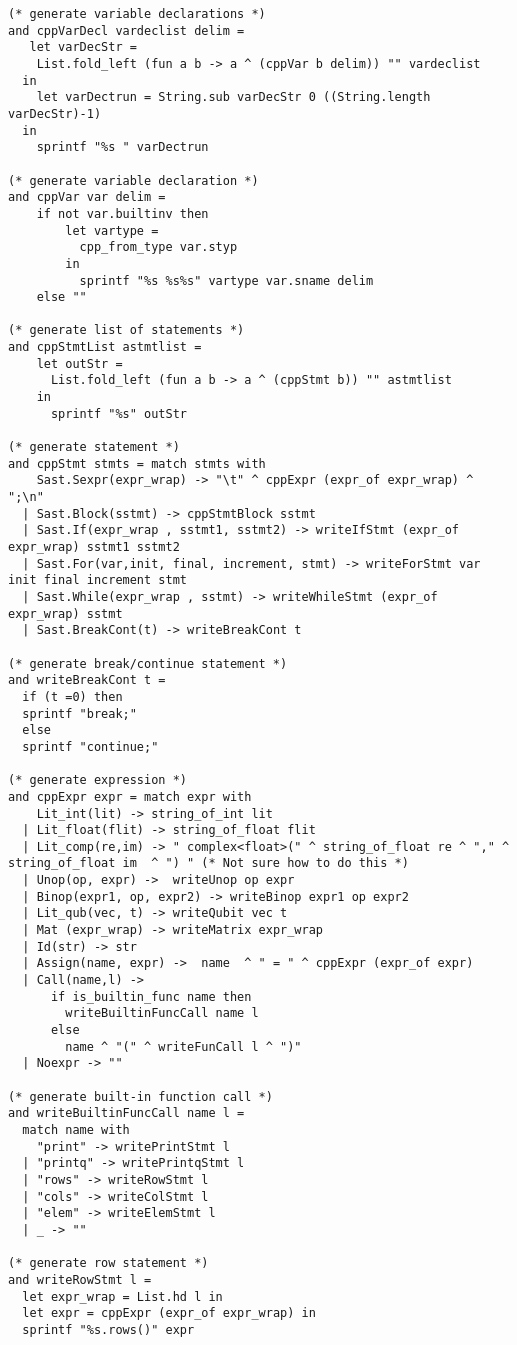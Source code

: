 \begin{lstlisting}
(* generate variable declarations *)
and cppVarDecl vardeclist delim =
   let varDecStr =
    List.fold_left (fun a b -> a ^ (cppVar b delim)) "" vardeclist
  in
    let varDectrun = String.sub varDecStr 0 ((String.length varDecStr)-1)
  in
    sprintf "%s " varDectrun

(* generate variable declaration *)   
and cppVar var delim =
    if not var.builtinv then
        let vartype =
          cpp_from_type var.styp
        in 
          sprintf "%s %s%s" vartype var.sname delim
    else ""

(* generate list of statements *)
and cppStmtList astmtlist =    
    let outStr =
      List.fold_left (fun a b -> a ^ (cppStmt b)) "" astmtlist
    in
      sprintf "%s" outStr

(* generate statement *)
and cppStmt stmts = match stmts with
    Sast.Sexpr(expr_wrap) -> "\t" ^ cppExpr (expr_of expr_wrap) ^ ";\n"  
  | Sast.Block(sstmt) -> cppStmtBlock sstmt
  | Sast.If(expr_wrap , sstmt1, sstmt2) -> writeIfStmt (expr_of expr_wrap) sstmt1 sstmt2
  | Sast.For(var,init, final, increment, stmt) -> writeForStmt var init final increment stmt
  | Sast.While(expr_wrap , sstmt) -> writeWhileStmt (expr_of expr_wrap) sstmt
  | Sast.BreakCont(t) -> writeBreakCont t

(* generate break/continue statement *)
and writeBreakCont t =
  if (t =0) then
  sprintf "break;"
  else
  sprintf "continue;"

(* generate expression *)
and cppExpr expr = match expr with
    Lit_int(lit) -> string_of_int lit
  | Lit_float(flit) -> string_of_float flit
  | Lit_comp(re,im) -> " complex<float>(" ^ string_of_float re ^ "," ^ string_of_float im  ^ ") " (* Not sure how to do this *)
  | Unop(op, expr) ->  writeUnop op expr
  | Binop(expr1, op, expr2) -> writeBinop expr1 op expr2
  | Lit_qub(vec, t) -> writeQubit vec t
  | Mat (expr_wrap) -> writeMatrix expr_wrap
  | Id(str) -> str 
  | Assign(name, expr) ->  name  ^ " = " ^ cppExpr (expr_of expr)
  | Call(name,l) ->
      if is_builtin_func name then
        writeBuiltinFuncCall name l
      else
        name ^ "(" ^ writeFunCall l ^ ")"    
  | Noexpr -> ""

(* generate built-in function call *)
and writeBuiltinFuncCall name l =
  match name with
    "print" -> writePrintStmt l
  | "printq" -> writePrintqStmt l
  | "rows" -> writeRowStmt l
  | "cols" -> writeColStmt l
  | "elem" -> writeElemStmt l
  | _ -> ""

(* generate row statement *)
and writeRowStmt l =
  let expr_wrap = List.hd l in
  let expr = cppExpr (expr_of expr_wrap) in 
  sprintf "%s.rows()" expr


\end{lstlisting}
